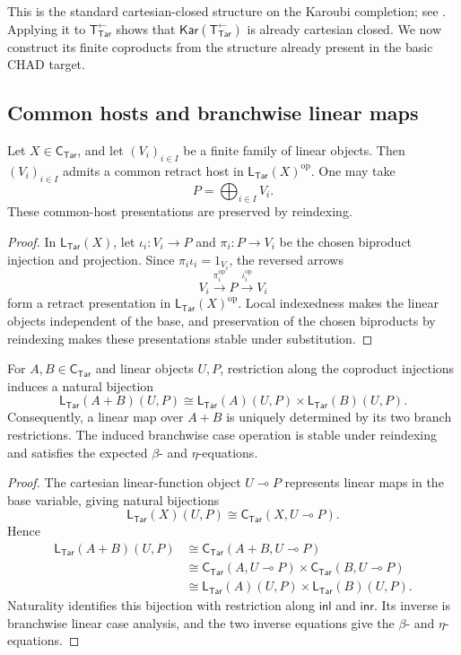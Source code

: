 \documentclass[runningheads,envcountsame]{llncs}
\newcommand{\Tar}{\mathsf{Tar}}
\newcommand{\CTar}{\mathsf C_{\Tar}}
\newcommand{\LTar}{\mathsf L_{\Tar}}
\newcommand{\TotTar}{\mathsf T_{\Tar}^{\leftarrow}}
\newcommand{\Kar}{\mathsf{Kar}}
\begin{document}
This is the standard cartesian-closed structure on the Karoubi completion; see
\cite{Hoofman1993,HoofmanMoerdijk1995}. Applying it to $\TotTar$ shows that
$\Kar(\TotTar)$ is already cartesian closed. We now construct its finite
coproducts from the structure already present in the basic CHAD target.

\subsection{Common hosts and branchwise linear maps}

\begin{lemma}
\label{lem:target-common-hosts}
Let $X\in\CTar$, and let $(V_i)_{i\in I}$ be a finite family of linear
objects. Then $(V_i)_{i\in I}$ admits a common retract host in
$\LTar(X)^{\mathrm{op}}$. One may take
$$
P=\bigoplus_{i\in I}V_i.
$$
These common-host presentations are preserved by reindexing.
\end{lemma}

\begin{proof}
In $\LTar(X)$, let $\iota_i:V_i\to P$ and $\pi_i:P\to V_i$ be the
chosen biproduct injection and projection. Since
$\pi_i\iota_i=1_{V_i}$, the reversed arrows
$$
V_i\xrightarrow{\pi_i^{\mathrm{op}}}P
\xrightarrow{\iota_i^{\mathrm{op}}}V_i
$$
form a retract presentation in $\LTar(X)^{\mathrm{op}}$. Local indexedness
makes the linear objects independent of the base, and preservation of the
chosen biproducts by reindexing makes these presentations stable under
substitution.
\end{proof}

\begin{lemma}
\label{lem:target-linear-case}
For $A,B\in\CTar$ and linear objects $U,P$, restriction along the coproduct
injections induces a natural bijection
$$
\LTar(A+B)(U,P)
\cong
\LTar(A)(U,P)\times\LTar(B)(U,P).
$$
Consequently, a linear map over $A+B$ is uniquely determined by its two branch
restrictions. The induced branchwise case operation is stable under reindexing
and satisfies the expected $\beta$- and $\eta$-equations.
\end{lemma}

\begin{proof}
The cartesian linear-function object $U\multimap P$ represents linear maps
in the base variable, giving natural bijections
$$
\LTar(X)(U,P)\cong\CTar(X,U\multimap P).
$$
Hence
$$
\begin{aligned}
\LTar(A+B)(U,P)
&\cong\CTar(A+B,U\multimap P)\\
&\cong\CTar(A,U\multimap P)
\times\CTar(B,U\multimap P)\\
&\cong\LTar(A)(U,P)\times\LTar(B)(U,P).
\end{aligned}
$$
Naturality identifies this bijection with restriction along
$\mathsf{inl}$ and $\mathsf{inr}$. Its inverse is branchwise linear case
analysis, and the two inverse equations give the $\beta$- and
$\eta$-equations.
\end{proof}
\end{document}
